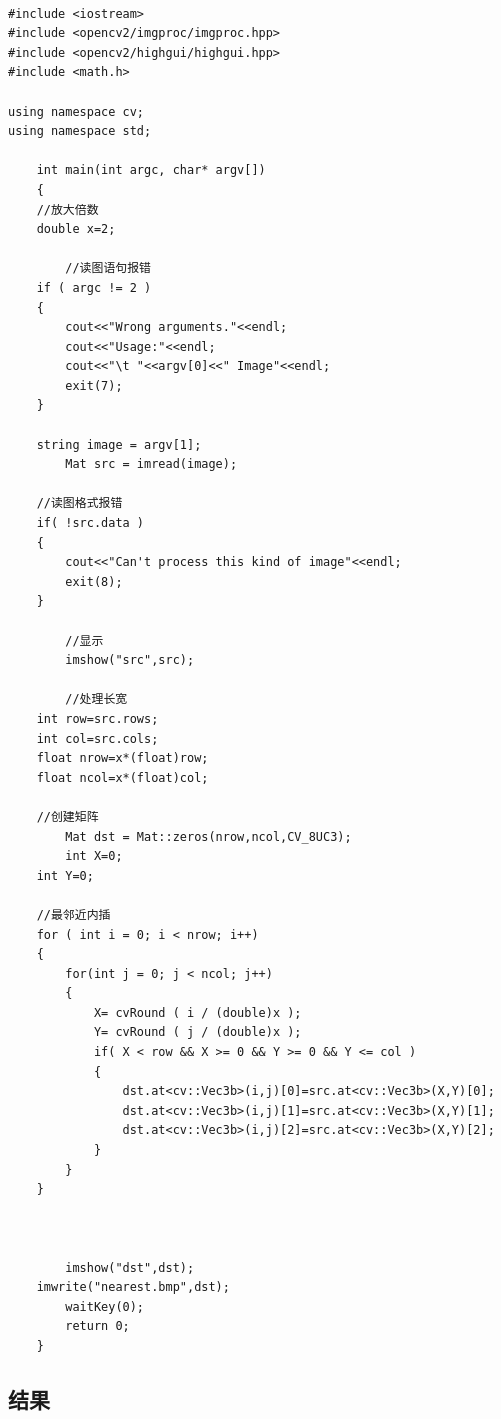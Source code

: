 \documentclass{article}
\begin{document}
\begin{lstlisting}[caption={}]

#include <iostream> 
#include <opencv2/imgproc/imgproc.hpp>
#include <opencv2/highgui/highgui.hpp>
#include <math.h>

using namespace cv;
using namespace std;

    int main(int argc, char* argv[])  
    {
	//放大倍数  
	double x=2;

        //读图语句报错
	if ( argc != 2 )
	{
		cout<<"Wrong arguments."<<endl;
		cout<<"Usage:"<<endl;
		cout<<"\t "<<argv[0]<<" Image"<<endl;
		exit(7);
	}

	string image = argv[1];
        Mat src = imread(image);  
       
	//读图格式报错
	if( !src.data )
	{
		cout<<"Can't process this kind of image"<<endl;
		exit(8);
	}

        //显示  
        imshow("src",src);  
      
        //处理长宽  
	int row=src.rows;
	int col=src.cols;
	float nrow=x*(float)row;
	float ncol=x*(float)col;
	
	//创建矩阵
        Mat dst = Mat::zeros(nrow,ncol,CV_8UC3);  
      	int X=0;
	int Y=0;

	//最邻近内插
	for ( int i = 0; i < nrow; i++)
	{
		for(int j = 0; j < ncol; j++)
		{
			X= cvRound ( i / (double)x );
			Y= cvRound ( j / (double)x );
			if( X < row && X >= 0 && Y >= 0 && Y <= col )
			{	
				dst.at<cv::Vec3b>(i,j)[0]=src.at<cv::Vec3b>(X,Y)[0];
				dst.at<cv::Vec3b>(i,j)[1]=src.at<cv::Vec3b>(X,Y)[1];
				dst.at<cv::Vec3b>(i,j)[2]=src.at<cv::Vec3b>(X,Y)[2];
			}
		}
	}        


      
        imshow("dst",dst);  
 	imwrite("nearest.bmp",dst);
        waitKey(0);  
        return 0;  
    }  

\end{lstlisting}

\newpage
\subsection{结果}
\end{document}
